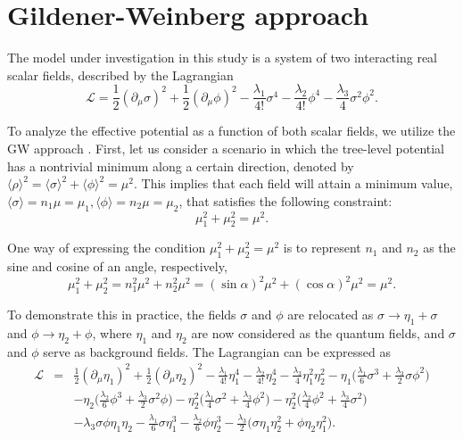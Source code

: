 \documentclass[11pt,a4paper,english,superscriptaddress,preprint,aps,prd]{revtex4}
\begin{document}
\section{Gildener-Weinberg approach}\label{Model}

The model under investigation in this study is a system of two interacting real scalar fields, described by the Lagrangian
\begin{equation}\label{model}
\mathcal{L}=\frac{1}{2}(\partial_\mu \sigma)^2+\frac{1}{2}(\partial_\mu\phi)^2-\frac{\lambda_1}{4!}\sigma^4-\frac{\lambda_2}{4!}\phi^4-\frac{\lambda_3}{4}\sigma^2\phi^2.
\end{equation}

To analyze the effective potential as a function of both scalar fields, we utilize the GW approach \cite{Gildener:1976ih}. First, let us consider a scenario in which the tree-level potential has a nontrivial minimum along a certain direction, denoted by $\langle\rho\rangle^2=\langle\sigma\rangle^2+\langle\phi\rangle^2=\mu^2$. This implies that each field will attain a minimum value, $\langle\sigma\rangle=n_1\mu=\mu_1, \langle\phi\rangle=n_2\mu=\mu_2$, that satisfies the following constraint:
\begin{equation}
\mu_1^2+\mu_2^2=\mu^2.
\end{equation}

One way of expressing the condition $\mu_1^2 + \mu_2^2 = \mu^2$ is to represent $n_1$ and $n_2$ as the sine and cosine of an angle, respectively,
\begin{equation}
\mu_1^2 + \mu_2^2 = n_1^2\mu^2 + n_2^2\mu^2 = (\sin\alpha)^2\mu^2 + (\cos\alpha)^2\mu^2 = \mu^2.
\end{equation}

To demonstrate this in practice, the fields $\sigma$ and $\phi$ are relocated as $\sigma\to\eta_1+\sigma$ and $\phi\to\eta_2+\phi$, where $\eta_1$ and $\eta_2$ are now considered as the quantum fields, and $\sigma$ and $\phi$ serve as background fields. The Lagrangian can be expressed as
\begin{eqnarray}  \mathcal{L}&=&\frac{1}{2}(\partial_\mu\eta_1)^2+\frac{1}{2}(\partial_\mu\eta_2)^2-\frac{\lambda_1}{4!}\eta_1^4-\frac{\lambda_2}{4!}\eta_2^4-\frac{\lambda_3}{4}\eta_1^2\eta_2^2-\eta_1\Bigr(\frac{\lambda_1}{6}\sigma^3+\frac{\lambda_3}{2}\sigma\phi^2\Bigr)\nonumber\\  && -\eta_2\Bigr(\frac{\lambda_2}{6}\phi^3+\frac{\lambda_3}{2}\sigma^2\phi\Bigr)-\eta_2^2\Bigr(\frac{\lambda_1}{4}\sigma^2+\frac{\lambda_3}{4}\phi^2\Bigr)-\eta_2^2\Bigr(\frac{\lambda_2}{4}\phi^2+\frac{\lambda_3}{4}\sigma^2\Bigr)\nonumber \\  && -\lambda_3\sigma\phi\eta_1\eta_2 - \frac{\lambda_1}{6}\sigma\eta_1^3-\frac{\lambda_2}{6}\phi\eta_2^3-\frac{\lambda_3}{2}\Bigr(\sigma\eta_1\eta_2^2+\phi\eta_2\eta_1^2\Bigr).\end{eqnarray}
\end{document}
